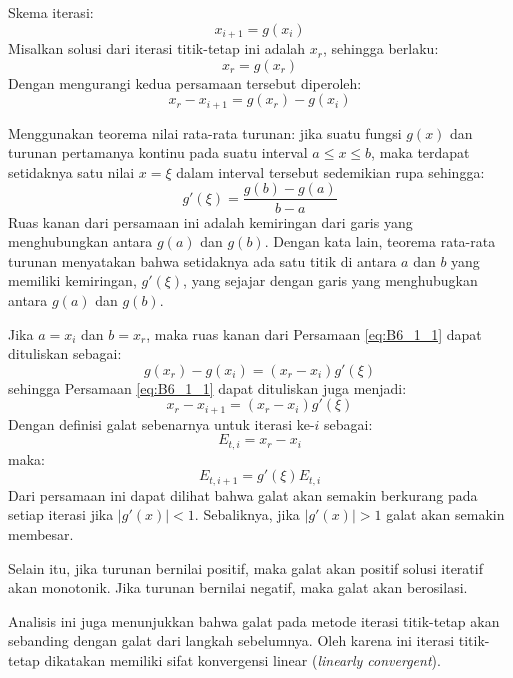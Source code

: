 \begin{frame}
\fontsize{9}{10}\selectfont

Skema iterasi:
$$
x_{i+1} = g(x_{i})
$$
Misalkan solusi dari iterasi titik-tetap ini adalah $x_r$, sehingga berlaku:
$$
x_{r} = g(x_r)
$$
Dengan mengurangi kedua persamaan tersebut diperoleh:
\begin{equation}
x_r - x_{i+1} = g(x_r) - g(x_i)
\label{eq:B6_1_1}
\end{equation}

Menggunakan teorema nilai rata-rata turunan: jika suatu fungsi $g(x)$
dan turunan pertamanya kontinu pada suatu interval $a \leq x \leq b$,
maka terdapat setidaknya satu nilai $x = \xi$ dalam interval tersebut
sedemikian rupa sehingga:
\begin{equation}
g'(\xi) = \frac{g(b) - g(a)}{b - a}
\label{eq:B6_1_2}  
\end{equation}
Ruas kanan dari persamaan ini adalah kemiringan dari garis yang menghubungkan antara
$g(a)$ dan $g(b)$. Dengan kata lain, teorema rata-rata turunan menyatakan bahwa
setidaknya ada satu titik di antara $a$ dan $b$ yang memiliki kemiringan,
$g'(\xi)$, yang sejajar dengan garis yang menghubugkan antara $g(a)$ dan
$g(b)$.
\end{frame}


\begin{frame}
\fontsize{9}{10}\selectfont

Jika $a = x_{i}$ dan $b = x_r$, maka ruas kanan dari
Persamaan \eqref{eq:B6_1_1} dapat dituliskan sebagai:
\begin{equation*}
g(x_r) - g(x_i) = (x_r - x_i) g'(\xi)
\end{equation*}
sehingga Persamaan \eqref{eq:B6_1_1} dapat dituliskan juga menjadi:
\begin{equation}
x_r - x_{i+1} = (x_r - x_i) g'(\xi)
\end{equation}
Dengan definisi galat sebenarnya untuk iterasi ke-$i$ sebagai:
$$
E_{t,i} = x_r - x_i
$$
maka:
$$
E_{t,i+1} = g'(\xi) E_{t,i}
$$
Dari persamaan ini dapat dilihat bahwa galat akan semakin berkurang pada
setiap iterasi jika $|g'(x)| < 1$. Sebaliknya, jika $|g'(x)| > 1$
galat akan semakin membesar.

Selain itu, jika turunan bernilai positif, maka galat akan positif solusi iteratif
akan monotonik. Jika turunan bernilai negatif, maka galat akan berosilasi.

Analisis ini juga menunjukkan bahwa galat pada metode iterasi titik-tetap akan
sebanding dengan galat dari langkah sebelumnya. Oleh karena ini iterasi titik-tetap
dikatakan memiliki sifat konvergensi linear (\textit{linearly convergent}).
\end{frame}